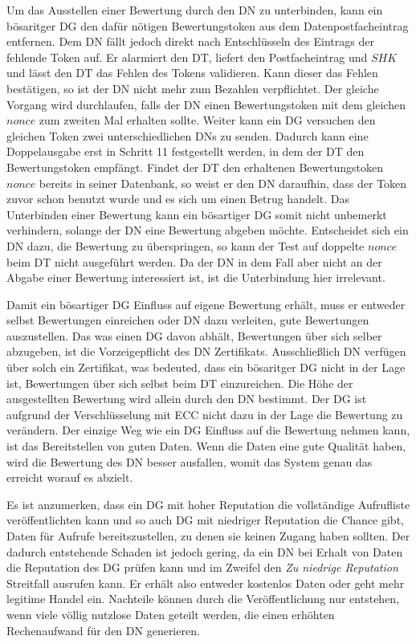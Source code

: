\documentclass[
	fontsize=11pt,
	headings=small,
	parskip=half,           %
	bibliography=totoc,
	numbers=noenddot,       %
	open=any,               %
]{scrreprt}
\begin{document}
Um das Ausstellen einer Bewertung durch den DN zu unterbinden, kann ein bösaritger DG den dafür nötigen Bewertungstoken aus dem Datenpostfacheintrag entfernen. Dem DN fällt jedoch direkt nach Entschlüsseln des Eintrags der fehlende Token auf. Er alarmiert den DT, liefert den Postfacheintrag und $SHK$ und lässt den DT das Fehlen des Tokens validieren. Kann dieser das Fehlen bestätigen, so ist der DN nicht mehr zum Bezahlen verpflichtet. Der gleiche Vorgang wird durchlaufen, falls der DN einen Bewertungstoken mit dem gleichen $nonce$ zum zweiten Mal erhalten sollte. Weiter kann ein DG versuchen den gleichen Token zwei unterschiedlichen DNs zu senden. Dadurch kann eine Doppelausgabe erst in Schritt 11 festgestellt werden, in dem der DT den Bewertungstoken empfängt. Findet der DT den erhaltenen Bewertungstoken $nonce$ bereits in seiner Datenbank, so weist er den DN daraufhin, dass der Token zuvor schon benutzt wurde und es sich um einen Betrug handelt. Das Unterbinden einer Bewertung kann ein bösartiger DG somit nicht unbemerkt verhindern, solange der DN eine Bewertung abgeben möchte. Entscheidet sich ein DN dazu, die Bewertung zu überspringen, so kann der Test auf doppelte $nonce$ beim DT nicht ausgeführt werden. Da der DN in dem Fall aber nicht an der Abgabe einer Bewertung interessiert ist, ist die Unterbindung hier irrelevant.

Damit ein bösartiger DG Einfluss auf eigene Bewertung erhält, muss er entweder selbst Bewertungen einreichen oder DN dazu verleiten, gute Bewertungen auszustellen. Das was einen DG davon abhält, Bewertungen über sich selber abzugeben, ist die Vorzeigepflicht des DN Zertifikats. Ausschließlich DN verfügen über solch ein Zertifikat, was bedeuted, dass ein bösaritger DG nicht in der Lage ist, Bewertungen über sich selbst beim DT einzureichen. Die Höhe der ausgestellten Bewertung wird allein durch den DN bestimmt. Der DG ist aufgrund der Verschlüsselung mit ECC nicht dazu in der Lage die Bewertung zu verändern. Der einzige Weg wie ein DG Einfluss auf die Bewertung nehmen kann, ist das Bereitstellen von guten Daten. Wenn die Daten eine gute Qualität haben, wird die Bewertung des DN besser ausfallen, womit das System genau das erreicht worauf es abzielt.

Es ist anzumerken, dass ein DG mit hoher Reputation die vollständige Aufrufliste veröffentlichten kann und so auch DG mit niedriger Reputation die Chance gibt, Daten für Aufrufe bereitszustellen, zu denen sie keinen Zugang haben sollten. Der dadurch entstehende Schaden ist jedoch gering, da ein DN bei Erhalt von Daten die Reputation des DG prüfen kann und im Zweifel den \textit{Zu niedrige Reputation} Streitfall ausrufen kann. Er erhält also entweder kostenlos Daten oder geht mehr legitime Handel ein. Nachteile können durch die Veröffentlichung nur entstehen, wenn viele völlig nutzlose Daten geteilt werden, die einen erhöhten Rechenaufwand für den DN generieren.
\end{document}
